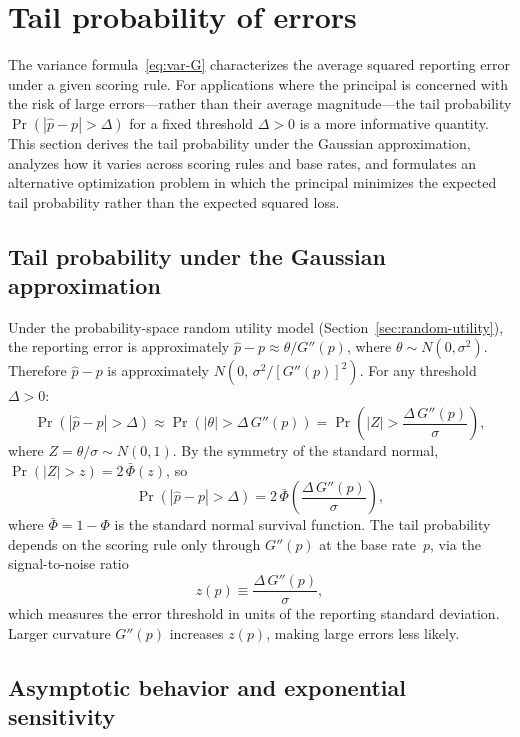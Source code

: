 \documentclass[11pt]{article}
\begin{document}
\section{Tail probability of errors}\label{sec:tail-prob}

The variance formula~\eqref{eq:var-G} characterizes the average squared reporting error under a given scoring rule. For applications where the principal is concerned with the risk of large errors---rather than their average magnitude---the tail probability $\Pr(|\hat{p} - p| > \Delta)$ for a fixed threshold $\Delta > 0$ is a more informative quantity. This section derives the tail probability under the Gaussian approximation, analyzes how it varies across scoring rules and base rates, and formulates an alternative optimization problem in which the principal minimizes the expected tail probability rather than the expected squared loss.

\subsection{Tail probability under the Gaussian approximation}

Under the probability-space random utility model (Section~\ref{sec:random-utility}), the reporting error is approximately $\hat{p} - p \approx \theta / G''(p)$, where $\theta \sim N(0, \sigma^2)$. Therefore $\hat{p} - p$ is approximately $N(0,\, \sigma^2/[G''(p)]^2)$. For any threshold $\Delta > 0$:
\[
\Pr(|\hat{p} - p| > \Delta) \approx \Pr\!\left(|\theta| > \Delta\,G''(p)\right) = \Pr\!\left(|Z| > \frac{\Delta\,G''(p)}{\sigma}\right),
\]
where $Z = \theta/\sigma \sim N(0,1)$. By the symmetry of the standard normal, $\Pr(|Z| > z) = 2\,\bar{\Phi}(z)$, so
\begin{equation}\label{eq:tail-prob}
	\Pr(|\hat{p} - p| > \Delta) = 2\,\bar{\Phi}\!\left(\frac{\Delta\,G''(p)}{\sigma}\right),
\end{equation}
where $\bar{\Phi} = 1 - \Phi$ is the standard normal survival function. The tail probability depends on the scoring rule only through $G''(p)$ at the base rate~$p$, via the signal-to-noise ratio
\begin{equation}\label{eq:z-def}
	z(p) \equiv \frac{\Delta\,G''(p)}{\sigma},
\end{equation}
which measures the error threshold in units of the reporting standard deviation. Larger curvature $G''(p)$ increases $z(p)$, making large errors less likely.

\subsection{Asymptotic behavior and exponential sensitivity}
\end{document}
